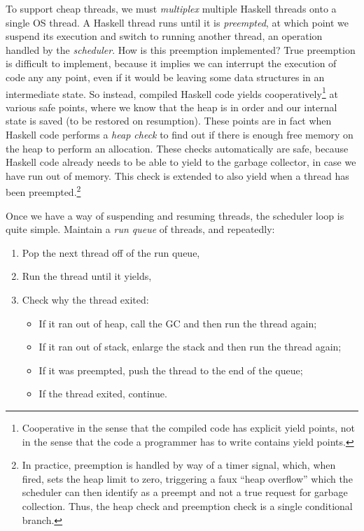 To support cheap threads, we must \emph{multiplex} multiple Haskell
threads onto a single OS thread.  A Haskell thread runs until it is
\emph{preempted}, at which point we suspend its execution and switch to
running another thread, an operation handled by the \emph{scheduler}.
How is this preemption implemented?  True preemption is difficult to
implement, because it implies we can interrupt the execution of code any
any point, even if it would be leaving some data structures in an
intermediate state.  So instead, compiled Haskell code yields
cooperatively\footnote{Cooperative in the sense that the compiled code
has explicit yield points, not in the sense that the code a programmer
has to write contains yield points.} at various safe points, where we
know that the heap is in order and our internal state is saved (to be
restored on resumption).  These points are in fact when Haskell code
performs a \emph{heap check} to find out if there is enough free memory
on the heap to perform an allocation.  These checks automatically are
safe, because Haskell code already needs to be able to yield to the
garbage collector, in case we have run out of memory.  This check is
extended to also yield when a thread has been preempted.\footnote{ In
practice, preemption is handled by way of a timer signal, which, when
fired, sets the heap limit to zero, triggering a faux ``heap overflow''
which the scheduler can then identify as a preempt and not a true
request for garbage collection.  Thus, the heap check and preemption
check is a single conditional branch.}

Once we have a way of suspending and resuming threads, the scheduler
loop is quite simple. Maintain a \emph{run queue} of threads, and repeatedly:

\begin{enumerate}
    \item Pop the next thread off of the run queue,
    \item Run the thread until it yields,
    \item Check why the thread exited:
        \begin{itemize}
            \item If it ran out of heap, call the GC and then run the
                thread again;
            \item If it ran out of stack, enlarge the stack and then run
                the thread again;
            \item If it was preempted, push the thread to the end of the queue;
            \item If the thread exited, continue.
        \end{itemize}
\end{enumerate}

